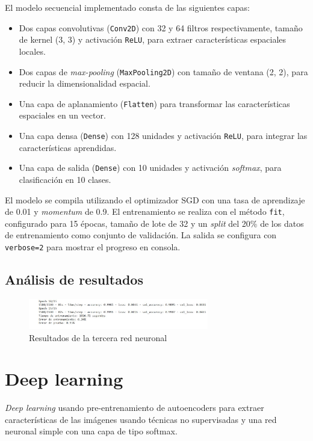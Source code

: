 El modelo secuencial implementado consta de las siguientes capas:
\begin{itemize}
	\item Dos capas convolutivas (\texttt{Conv2D}) con 32 y 64 filtros respectivamente, tamaño de kernel (3, 3) y activación \texttt{ReLU}, para extraer características espaciales locales.
	\item Dos capas de \textit{max-pooling} (\texttt{MaxPooling2D}) con tamaño de ventana (2, 2), para reducir la dimensionalidad espacial.
	\item Una capa de aplanamiento (\texttt{Flatten}) para transformar las características espaciales en un vector.
	\item Una capa densa (\texttt{Dense}) con 128 unidades y activación \texttt{ReLU}, para integrar las características aprendidas.
	\item Una capa de salida (\texttt{Dense}) con 10 unidades y activación \textit{softmax}, para clasificación en 10 clases.
\end{itemize}

El modelo se compila utilizando el optimizador SGD con una tasa de aprendizaje de 0.01 y \textit{momentum} de 0.9. El entrenamiento se realiza con el método \texttt{fit}, configurado para 15 épocas, tamaño de lote de 32 y un \textit{split} del 20\% de los datos de entrenamiento como conjunto de validación. La salida se configura con \texttt{verbose=2} para mostrar el progreso en consola.

\subsection{Análisis de resultados}

\begin{figure}[H]
	\centering
	\includegraphics[width=0.7\textwidth]{imgs/results-red3.JPG}
	\caption{Resultados de la tercera red neuronal}
	\label{fig:results-red3}
\end{figure}


\section{Deep learning}

\textit{Deep learning} usando pre-entrenamiento de autoencoders para extraer características de las imágenes usando técnicas no supervisadas y una red neuronal simple con una capa de tipo softmax.

